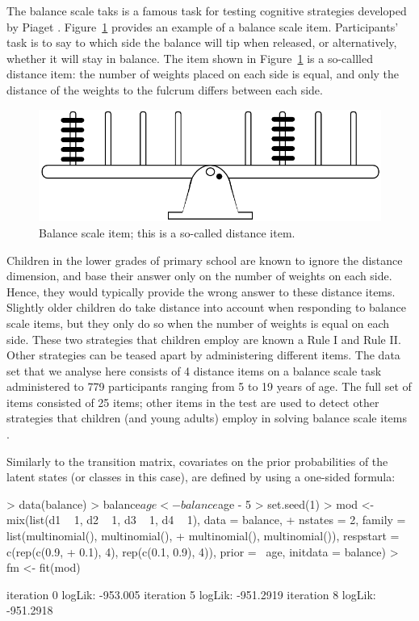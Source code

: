 \documentclass[article]{jss}
\begin{document}
The balance scale taks is a famous task for testing cognitive
strategies developed by Piaget \citep{Siegler1981}.
Figure~\ref{fig:balance} provides an example of a balance scale item.
Participants' task is to say to which side the balance will tip when
released, or alternatively, whether it will stay in balance.  The item
shown in Figure~\ref{fig:balance} is a so-callled distance item: the
number of weights placed on each side is equal, and only the distance
of the weights to the fulcrum differs between each side.

\begin{figure}[htbp]
\begin{center}
	\includegraphics{graphs/baldist.pdf}
	\caption{Balance scale item; this is a so-called distance item.}
	\label{fig:balance}  
\end{center}
\end{figure}

Children in the lower grades of primary school are known to ignore the
distance dimension, and base their answer only on the number of
weights on each side.  Hence, they would typically provide the wrong
answer to these distance items.  Slightly older children do take
distance into account when responding to balance scale items, but they
only do so when the number of weights is equal on each side.  These
two strategies that children employ are known a Rule I and Rule II.
Other strategies can be teased apart by administering different items.
The  data set that we analyse here consists of 4
distance items on a balance scale task administered to 779
participants ranging from 5 to 19 years of age.  The full set of items
consisted of 25 items; other items in the test are used to detect
other strategies that children (and young adults) employ in solving
balance scale items \citep[see][for details]{Jansen2002}. 

Similarly to the transition matrix, covariates on the prior
probabilities of the latent states (or classes in this case), are
defined by using a one-sided formula:
\begin{Schunk}
\begin{Sinput}
> data(balance)
> balance$age <- balance$age - 5
> set.seed(1)
> mod <- mix(list(d1 ~ 1, d2 ~ 1, d3 ~ 1, d4 ~ 1), data = balance, 
+     nstates = 2, family = list(multinomial(), multinomial(), 
+         multinomial(), multinomial()), respstart = c(rep(c(0.9, 
+         0.1), 4), rep(c(0.1, 0.9), 4)), prior = ~age, initdata = balance)
> fm <- fit(mod)
\end{Sinput}
\begin{Soutput}
iteration 0 logLik: -953.005 
iteration 5 logLik: -951.2919 
iteration 8 logLik: -951.2918 
\end{Soutput}
\end{Schunk}
\end{document}
